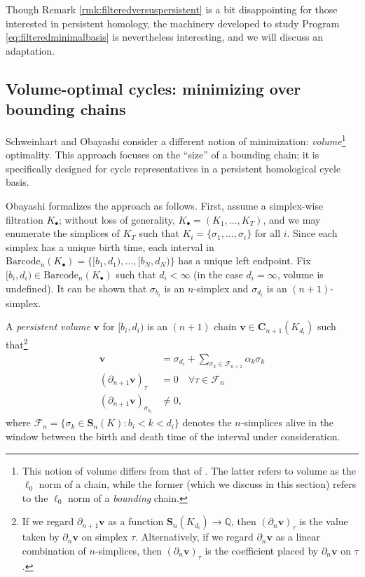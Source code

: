 \documentclass[11pt,onecolumn]{article}
\newcommand{\Q}{\mathbb{Q}}
\newcommand{\Chains}{\mathbf{C}}
\newcommand{\Simplices}[0]{\mathbf{S}}
\newcommand{\volvec}{\mathbf{v}}
\newcommand{\barcode}{\mathrm{Barcode}}
\newcommand{\pr}{Program }
\newcommand{\simplex}{\sigma}
\theoremstyle{plain}
\theoremstyle{definition}
\begin{document}
Though Remark \ref{rmk:filteredversuspersistent} is a bit disappointing for those interested in persistent homology, the machinery developed to study \pr \eqref{eq:filteredminimalbasis} is nevertheless interesting, and we will discuss an adaptation.


\subsection{Volume-optimal cycles: minimizing over bounding chains}\label{sec:volume}

Schweinhart \cite{schweinhart2015statistical} and  Obayashi \cite{Obayashi2018} consider a different notion of minimization: \emph{volume}\footnote{This notion of volume differs from that of \cite{chenhardness}. The latter refers to volume as the $\ell_0$ norm of a chain, while the former (which we discuss in this section) refers to the $\ell_0$ norm of a \emph{bounding} chain.} optimality.  This approach focuses on the ``size'' of a bounding chain; it is specifically designed for cycle representatives in a persistent homological cycle basis.    


Obayashi \cite{Obayashi2018} formalizes the approach as follows.  First, assume a simplex-wise filtration $K_\bullet$; without loss of generality, $K_\bullet = (K_1, \ldots, K_T)$, and we may enumerate the simplices of $K_T$ such that $K_i = \{\simplex_1, \ldots, \simplex_i\}$ for all $i$.  Since each simplex has a unique birth time, each interval in  $\barcode_n(K_\bullet)= \{[b_1, d_1), \ldots, [b_N, d_N)\}$ has a unique left  endpoint.  Fix $[b_i,d_i) \in \barcode_n(K_\bullet)$ such that $d_i < \infty$ (in the case $d_i = \infty$, volume is undefined).    It can be shown that $\sigma_{b_i}$ is an $n$-simplex and  $\sigma_{d_i}$ is an $(n+1)$-simplex.

A \emph{persistent volume} $\volvec$ for $[b_i, d_i)$ is an $(n+1)$ chain $\volvec \in \Chains_{n+1}(K_{d_i})$ such that\footnote{If we regard $\partial_{n+1}\volvec$ as a function $\Simplices_{n}(K_{d_i}) \to \Q$, then $(\partial_n \volvec)_\tau$ is the value taken by $\partial_n \volvec$ on simplex $\tau$.  Alternatively, if we regard $\partial_n \volvec$ as a linear combination of $n$-simplices, then $(\partial_n \volvec)_\tau$ is the coefficient placed by $\partial_n \volvec$ on $\tau$.}
\begin{align}
    \volvec   & = \sigma_{d_i} + \sum_{\sigma_k \in \mathcal{F}_{n+1}} \alpha_k\sigma_k \label{obacond1} \\
    (\partial_{n+1} \volvec)_\tau  & = 0 \quad \forall \tau \in \mathcal{F}_n \label{obacond2}\\
    (\partial_{n+1} \volvec)_{\sigma_{b_i}}  & \ne 0, \label{obacond3}
\end{align}
where $\mathcal{F}_n = \{\sigma_k \in \Simplices_n(K) : b_i < k < d_i \}$ denotes the $n$-simplices alive in the window between the birth and death time of the interval under consideration.   
\end{document}
